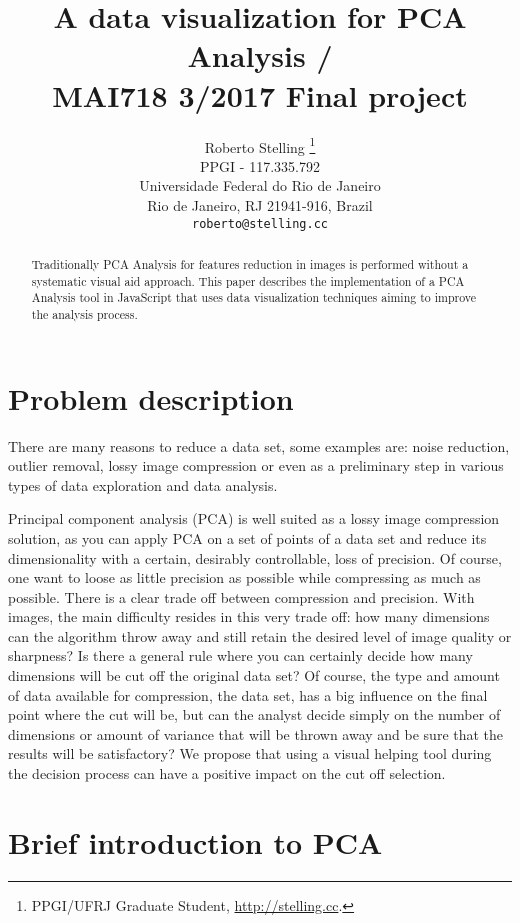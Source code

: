 \documentclass{article} %
\title{A data visualization for PCA Analysis / \\ MAI718 3/2017 Final project}
\author{Roberto Stelling \thanks{ PPGI/UFRJ Graduate Student, \href{http://stelling.cc}{http://stelling.cc}.} \\
PPGI - 117.335.792\\
Universidade Federal do Rio de Janeiro\\
Rio de Janeiro, RJ 21941-916, Brazil \\
\texttt{roberto@stelling.cc}
}
\begin{document}
\maketitle
\pagestyle{plain}

\begin{abstract}
Traditionally PCA Analysis for features reduction in images is performed without a systematic visual aid approach. This paper describes the implementation of a PCA Analysis tool in JavaScript that uses data visualization techniques aiming to improve the analysis process.
\end{abstract}

\section{Problem description}
There are many reasons to reduce a data set, some examples are: noise reduction, outlier removal, lossy image compression or even as a preliminary step in various types of data exploration and data analysis.\par
Principal component analysis (PCA) is well suited as a lossy image compression solution, as you can apply PCA on a set of points of a data set and reduce its dimensionality with a certain, desirably controllable, loss of precision. Of course, one want to loose as little precision as possible while compressing as much as possible. There is a clear trade off between compression and precision. With images, the main difficulty resides in this very trade off: how many dimensions can the algorithm throw away and still retain the desired level of image quality or sharpness? Is there a general rule where you can certainly decide how many dimensions will be cut off the original data set? Of course, the type and amount of data available for compression, the data set, has a big influence on the final point where the cut will be, but can the analyst decide simply on the number of dimensions or amount of variance that will be thrown away and be sure that the results will be satisfactory? We propose that using a visual helping tool during the decision process can have a positive impact on the cut off selection.

\section{Brief introduction to PCA}
\end{document}
